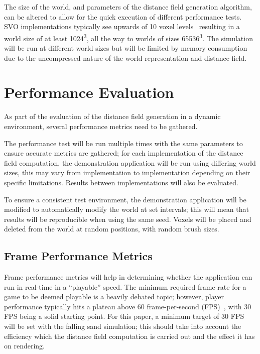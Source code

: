The size of the world, and parameters of the distance field generation algorithm, can be altered to allow for the quick
execution of different performance tests. SVO implementations typically see upwards of 10 voxel
levels~\cite{laine2010efficient} resulting in a world size of at least 1024\textsuperscript{3}, all the way to worlds of
sizes 65536\textsuperscript{3}. The simulation will be run at different world sizes but will be limited by memory
consumption due to the uncompressed nature of the world representation and distance field.

\section{Performance Evaluation}\label{sec:perf_eval}
As part of the evaluation of the distance field generation in a dynamic environment, several performance metrics need to
be gathered.

The performance test will be run multiple times with the same parameters to ensure accurate metrics are gathered; for
each implementation of the distance field computation, the demonstration application will be run using differing world
sizes, this may vary from implementation to implementation depending on their specific limitations. Results between
implementations will also be evaluated.

To ensure a consistent test environment, the demonstration application will be modified to automatically modify the
world at set intervals; this will mean that results will be reproducible when using the same seed. Voxels will be placed
and deleted from the world at random positions, with random brush sizes.

\subsection{Frame Performance Metrics}\label{sec:frame_perf_metrics}
Frame performance metrics will help in determining whether the application can run in real-time in a ``playable'' speed.
The minimum required frame rate for a game to be deemed playable is a heavily debated topic; however, player performance
typically hits a plateau above 60 frame-per-second (FPS)~\cite{claypool2007frame}, with 30 FPS being a solid starting
point. For this paper, a minimum target of 30 FPS will be set with the falling sand simulation; this should take into
account the efficiency which the distance field computation is carried out and the effect it has on rendering.

